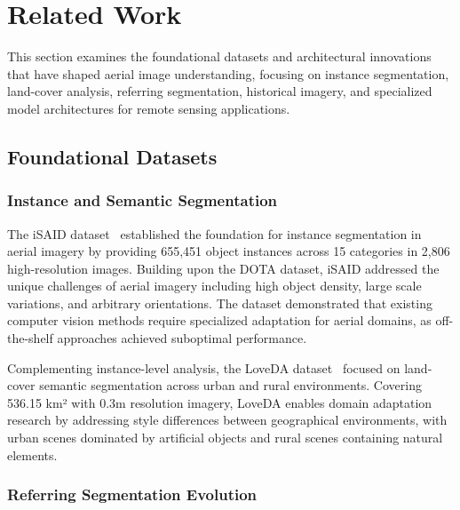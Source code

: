 
\section{Related Work}
\label{sec:related}

This section examines the foundational datasets and architectural innovations that have shaped aerial image understanding, focusing on instance segmentation, land-cover analysis, referring segmentation, historical imagery, and specialized model architectures for remote sensing applications.

\subsection{Foundational Datasets}

\subsubsection{Instance and Semantic Segmentation}

The iSAID dataset~\cite{zamir2019isaid} established the foundation for instance segmentation in aerial imagery by providing 655,451 object instances across 15 categories in 2,806 high-resolution images. Building upon the DOTA dataset, iSAID addressed the unique challenges of aerial imagery including high object density, large scale variations, and arbitrary orientations. The dataset demonstrated that existing computer vision methods require specialized adaptation for aerial domains, as off-the-shelf approaches achieved suboptimal performance.

Complementing instance-level analysis, the LoveDA dataset~\cite{wang2021loveda} focused on land-cover semantic segmentation across urban and rural environments. Covering 536.15 km² with 0.3m resolution imagery, LoveDA enables domain adaptation research by addressing style differences between geographical environments, with urban scenes dominated by artificial objects and rural scenes containing natural elements.

\subsubsection{Referring Segmentation Evolution}

